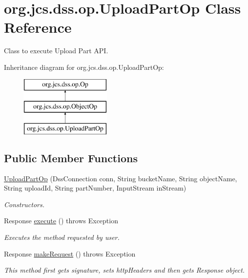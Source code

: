 \hypertarget{classorg_1_1jcs_1_1dss_1_1op_1_1UploadPartOp}{}\section{org.\+jcs.\+dss.\+op.\+Upload\+Part\+Op Class Reference}
\label{classorg_1_1jcs_1_1dss_1_1op_1_1UploadPartOp}


Class to execute Upload Part A\+PI.  


Inheritance diagram for org.\+jcs.\+dss.\+op.\+Upload\+Part\+Op\+:\begin{figure}[H]
\begin{center}
\leavevmode
\includegraphics[height=3.000000cm]{classorg_1_1jcs_1_1dss_1_1op_1_1UploadPartOp}
\end{center}
\end{figure}
\subsection*{Public Member Functions}
\begin{DoxyCompactItemize}
\item 
\hyperlink{classorg_1_1jcs_1_1dss_1_1op_1_1UploadPartOp_a694f2d71544e9a9f899a3d07da6f0446}{Upload\+Part\+Op} (Dss\+Connection conn, String bucket\+Name, String object\+Name, String upload\+Id, String part\+Number, Input\+Stream in\+Stream)\hypertarget{classorg_1_1jcs_1_1dss_1_1op_1_1UploadPartOp_a694f2d71544e9a9f899a3d07da6f0446}{}\label{classorg_1_1jcs_1_1dss_1_1op_1_1UploadPartOp_a694f2d71544e9a9f899a3d07da6f0446}

\begin{DoxyCompactList}\small\item\em Constructors. \end{DoxyCompactList}\item 
Response \hyperlink{classorg_1_1jcs_1_1dss_1_1op_1_1UploadPartOp_a609e28843a72dba3a60e48cbf2ccbce8}{execute} ()  throws Exception 
\begin{DoxyCompactList}\small\item\em Executes the method requested by user. \end{DoxyCompactList}\item 
Response \hyperlink{classorg_1_1jcs_1_1dss_1_1op_1_1UploadPartOp_a21c2b882a81a728e29cbb0de230c6344}{make\+Request} ()  throws Exception 
\begin{DoxyCompactList}\small\item\em This method first gets signature, sets http\+Headers and then gets Response object. \end{DoxyCompactList}\end{DoxyCompactItemize}
